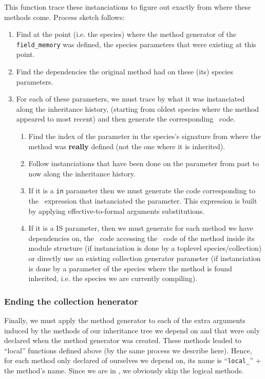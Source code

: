 This function trace these instanciations to figure out exactly from
 where these methods come. Process sketch follows:
\begin{enumerate}
\item Find at the point (i.e. the species) where the method generator
 of the {\tt field\_memory} was defined, the species parameters that
 were existing at this point. 
\item Find the dependencies the original method had on these (its) species
    parameters.
\item For each of these parameters, we must trace by what it was
    instanciated along the inheritance history, (starting from oldest
    species where the method appeared to most recent) and then generate
    the corresponding \ocaml\ code.
    \begin{enumerate}
    \item Find the index of the parameter in the species's signature
    from where the method was {\bf really} defined (not the one where
    it is inherited).
    \item Follow instanciations that have been done on the parameter
    from past to now along the inheritance history.
    \item If it is a {\tt in} parameter then we must generate the code
    corresponding to the \focal\ expression that instanciated the
    parameter. This expression is built by applying
    effective-to-formal arguments substitutions.
    \item If it is a IS parameter, then we must generate for each
    method we have dependencies on, the \ocaml\ code accessing the
    \ocaml\ code of the method inside its module structure (if
    instanciation is done by a toplevel species/collection) or
    directly use an existing collection generator parameter (if
    instanciation is done by a parameter of the species where the
    method is found inherited, i.e. the species we are currently
    compiling).
    \end{enumerate}
\end{enumerate}


\subsubsection{Ending the collection henerator}
Finally, we must apply the method generator to each of the extra
arguments induced by the methods of our inheritance tree we depend on
and that were only declared when the method generator was
created. These methods leaded to ``local'' functions defined above (by
the same process we describe here). Hence, for each  method only
declared of ourselves we depend on, its name is ``{\tt local\_}'' +
the method's name. Since we are in \ocaml, we obviously skip the logical
methods.

